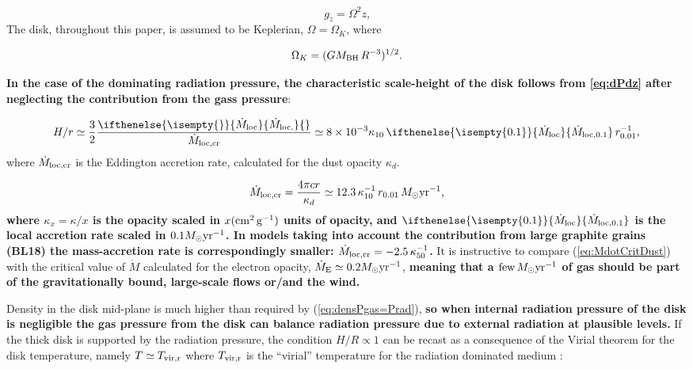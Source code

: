 \documentclass[12pt,english,preprint]{aastex}
\newcommand{\mybf}{\bf}
\newcommand{\su}[2]{#1_{\rm #2}}
\newcommand{\mdt}[1][]{ 
  \ifthenelse{\isempty{#1}}
  {\dot{M}_{\rm loc}}
  { {\dot M}_{\rm{loc},{#1}} } 
  } %
\newcommand{\mdtcr}{\su{\dot{M}}{loc,cr} }
\newcommand{\MsolYrM}{ \,M_{\odot}{\rm yr}^{-1} }
\begin{document}
\begin{equation}
g_{z}=\Omega^{2}z\mbox{,}\label{eq:gz}
\end{equation}
The disk, throughout this paper, is assumed to be Keplerian, $\Omega=\Omega_{K}$, where

\begin{equation}
\Omega_{K}=(G\su{M}{BH}\,R^{-3})^{1/2}\mbox{.}\label{eq:OmegaKepler}
\end{equation}

{\mybf
In the case of the dominating 
radiation pressure, the characteristic scale-height of the disk follows from \eqref{eq:dPdz} after neglecting the contribution from the gass
pressure}: 

\begin{equation}
H/r\simeq\frac{3}{2}\frac{\mdt{}}{\mdtcr}
\simeq8\times10^{-3}\kappa_{10}\,\mdt[0.1]\,r_{0.01}^{-1}\mbox{,}\label{eq:H2R_rad}
\end{equation}
where $\mdtcr$ is the Eddington accretion rate, calculated for the
dust opacity $\kappa_{d}$. 

\begin{equation}
\mdtcr=\frac{4\pi cr}{\kappa_{d}}\simeq12.3\,\kappa_{10}^{-1}
\,r_{0.01}\,M_{\odot}{\rm yr}^{-1}\mbox{,}\label{eq:MdotCritDust}
\end{equation}
{\mybf where $\kappa_x=\kappa/x$ is the opacity scaled in $x({\rm cm^2\,g^{-1}})$ units of opacity, 
and $\mdt[0.1]$ is the local accretion rate scaled
in $0.1 M_{\odot}{\rm yr}^{-1}$. In 
models taking into account the contribution from large graphite grains (BL18) 
the mass-accretion rate is correspondingly smaller:
$\mdtcr = -2.5\,\kappa_{50}^{-1}$.}
It is instructive to compare (\ref{eq:MdotCritDust})
with the critical value of $\dot{M}$ calculated for the electron
opacity, $\dot{M}_{\text{E}}\simeq 0.2M_{\odot}{\rm yr}^{-1}$, {\mybf meaning that
a ${\rm few}\MsolYrM$ of gas should be part of the gravitationally
bound, large-scale flows or/and the wind.}


Density in the disk mid-plane is much higher than required by 
(\ref{eq:densPgas=Prad}), {\mybf so when internal radiation pressure
of the disk is negligible the gas pressure from the disk 
can balance radiation pressure due to external radiation at plausible levels.}
If the thick disk is supported by the radiation pressure, the condition
$H/R\propto1$ can be recast as a consequence of the Virial theorem
for the disk temperature, namely $T\simeq T_{{\rm vir,r}}$ where
$T_{{\rm vir,r}}$ is the ``virial'' temperature for the radiation
dominated medium \citep{Dorodnitsyn11a}:
\end{document}

